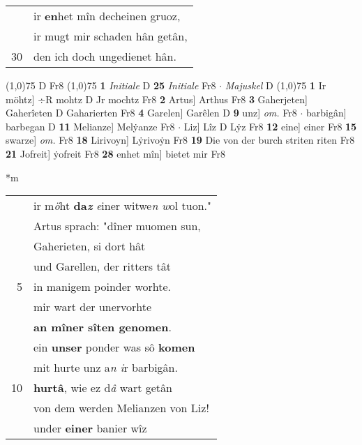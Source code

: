 \documentclass[8pt,a4paper,notitlepage]{article}
\begin{document}
\begin{table}[ht]
\begin{minipage}[t]{0.5\linewidth}
\begin{tabular}{rl}
 & ir \textbf{en}het mîn decheinen gruoz,\\ 
 & ir mugt mir schaden hân getân,\\ 
30 & den ich doch ungedienet hân.\\ 
\end{tabular}
\scriptsize
\line(1,0){75} \newline
D Fr8 \newline
\line(1,0){75} \newline
\textbf{1} \textit{Initiale} D  \textbf{25} \textit{Initiale} Fr8   $\cdot$ \textit{Majuskel} D  \newline
\line(1,0){75} \newline
\textbf{1} Ir möhtz] ÷R mohtz D Jr mochtz Fr8 \textbf{2} Artus] Arthus Fr8 \textbf{3} Gaherjeten] Gaherîeten D Gaharierten Fr8 \textbf{4} Garelen] Garêlen D \textbf{9} unz] \textit{om.} Fr8  $\cdot$ barbigân] barbegan D \textbf{11} Melianze] Melẏanze Fr8  $\cdot$ Liz] Lîz D Lẏz Fr8 \textbf{12} eine] einer Fr8 \textbf{15} swarze] \textit{om.} Fr8 \textbf{18} Lirivoyn] Lẏrivoẏn Fr8 \textbf{19} Die von der burch striten riten Fr8 \textbf{21} Jofreit] ẏofreit Fr8 \textbf{28} enhet mîn] bietet mir Fr8 \newline
\end{minipage}
\hspace{0.5cm}
\begin{minipage}[t]{0.5\linewidth}
\small
\begin{center}*m
\end{center}
\begin{tabular}{rl}
 & ir m\textit{ö}ht \textbf{da\textit{z}} \textit{e}iner witwe\textit{n w}ol tuon."\\ 
 & Artus sprach: "dîner muomen sun,\\ 
 & Gaherieten, si dort hât\\ 
 & und Garellen, der ritters tât\\ 
5 & in manigem poinder worhte.\\ 
 & mir wart der unervorhte\\ 
 & \textbf{an mîner sîten genomen}.\\ 
 & ein \textbf{unser} ponder was sô \textbf{komen}\\ 
 & mit hurte unz a\textit{n i}r barbigân.\\ 
10 & \textbf{hurtâ}, wie ez d\textit{â} wart getân\\ 
 & von dem werden Melianzen von Liz!\\ 
 & under \textbf{einer} banier wîz\\ 

\end{tabular}
\end{minipage}
\end{table}
\end{document}
